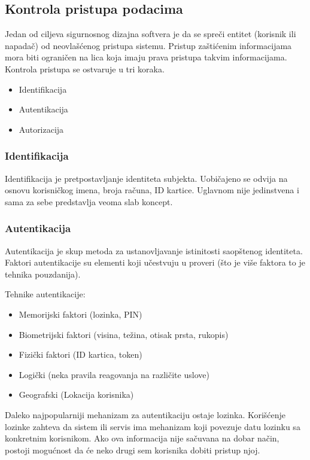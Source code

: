 \documentclass[a4paper]{article}
\begin{document}
\subsection{Kontrola pristupa podacima}
Jedan od ciljeva sigurnosnog dizajna softvera je da se spreči entitet (korisnik ili napadač) od neovlašćenog pristupa sistemu. Pristup zaštićenim informacijama mora biti ograničen na lica koja imaju prava pristupa takvim informacijama.
Kontrola pristupa se ostvaruje u tri koraka.
\begin{itemize}
	\item Identifikacija
	\item Autentikacija
	\item Autorizacija
\end{itemize} 

\subsubsection{Identifikacija}
Identifikacija je pretpostavljanje identiteta subjekta. Uobičajeno se odvija na osnovu korisničkog imena, broja računa, ID kartice. Uglavnom nije jedinstvena i sama za sebe predstavlja veoma slab koncept.

\subsubsection{Autentikacija}
Autentikacija je skup metoda za ustanovljavanje istinitosti saopštenog identiteta. Faktori autentikacije su elementi koji učestvuju u proveri (što je više faktora to je tehnika pouzdanija).

Tehnike autentikacije: 
    \begin{itemize}
        \item Memorijski faktori (lozinka, PIN)
        \item  Biometrijski faktori (visina, težina, otisak prsta, rukopis)
        \item Fizički faktori (ID kartica, token)
        \item Logički (neka pravila reagovanja na različite uslove)                                    
        \item Geografski (Lokacija korisnika)                                
    \end{itemize}

Daleko najpopularniji mehanizam za autentikaciju ostaje lozinka. Korišćenje lozinke zahteva da sistem ili servis 
ima mehanizam koji povezuje datu lozinku sa konkretnim korisnikom. Ako ova informacija nije sačuvana na dobar 
način, postoji mogućnost da će neko drugi sem korisnika dobiti pristup njoj.
\end{document}

